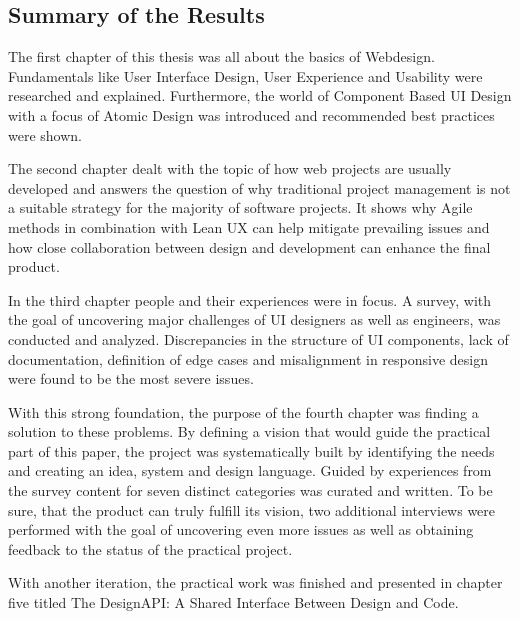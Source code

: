 \newpage
\subsection{Summary of the Results}
The first chapter of this thesis was all about the basics of Webdesign. Fundamentals like User
Interface Design, User Experience and Usability were researched and explained. Furthermore, the
world of Component Based UI Design with a focus of Atomic Design was introduced and recommended best
practices were shown.

The second chapter dealt with the topic of how web projects are usually developed and answers the
question of why traditional project management is not a suitable strategy for the majority of
software projects. It shows why Agile methods in combination with Lean UX can help mitigate
prevailing issues and how close collaboration between design and development can enhance the final
product. 

In the third chapter people and their experiences were in focus. A survey, with the goal of
uncovering major challenges of UI designers as well as engineers, was conducted and analyzed.
Discrepancies in the structure of UI components, lack of documentation, definition of edge cases and
misalignment in responsive design were found to be the most severe issues.

With this strong foundation, the purpose of the fourth chapter was finding a solution to these
problems. By defining a vision that would guide the practical part of this paper, the project was
systematically built by identifying the needs and creating an idea, system and design language.
Guided by experiences from the survey content for seven distinct categories was curated and written.
To be sure, that the product can truly fulfill its vision, two additional interviews were performed
with the goal of uncovering even more issues as well as obtaining feedback to the status of the
practical project. 

With another iteration, the practical work was finished and presented in chapter five titled The
DesignAPI: A Shared Interface Between Design and Code. 